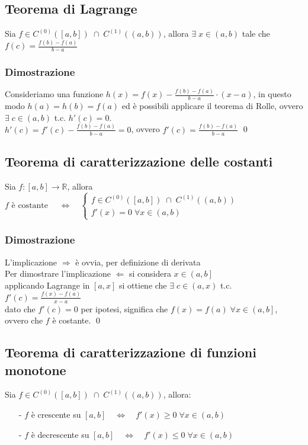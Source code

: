 \documentclass[a4paper]{article}
\newcommand\cont[2]{C^{(#1)} \left({#2}\right)}
\begin{document}
\subsection{Teorema di Lagrange}
Sia \(f \in \cont{0}{\left[a, b\right]} \; \cap \; \cont{1}{\left(a, b\right)}\), allora \(\exists \; x \in \left(a, b\right)\) tale
che \(\displaystyle f(c) = \frac{f(b) - f(a)}{b - a}\)

\subsubsection*{Dimostrazione}
Consideriamo una funzione \(\displaystyle h(x) = f(x) - \frac{f(b) - f(a)}{b- a} \cdot \left(x - a\right)\), in questo modo \(h(a) = h(b) = f(a)\)
ed è possibili applicare il teorema di Rolle, ovvero \(\exists \; c \in \left(a, b\right)\) t.c. \(h'(c) = 0\). \\
\(\displaystyle h'(c) = f'(c) - \frac{f(b) - f(a)}{b - a} = 0\), ovvero \(\displaystyle f'(c) = \frac{f(b) - f(a)}{b - a}\)
\qed

\subsection{Teorema di caratterizzazione delle costanti}
Sia \(f:\left[a,b\right] \to \mathbb{R}\), allora \(\displaystyle f \text{ è costante } \quad \Leftrightarrow \quad
\begin{cases}
	f \in \cont{0}{\left[a, b\right]} \; \cap \; \cont{1}{\left(a, b\right)} \\
	f'(x) = 0 \; \forall x \in \left(a, b\right)
\end{cases}\)

\subsubsection*{Dimostrazione}
L'implicazione \(\Rightarrow\) è ovvia, per definizione di derivata \\
Per dimostrare l'implicazione \(\Leftarrow\) si considera \(x \in \left(a, b\right]\) \\
applicando Lagrange in \(\left[a, x\right]\) si ottiene che \(\exists \; c \in \left(a, x\right)\) t.c. \(\displaystyle f'(c) = \frac{f(x)- f(a)}{x-a}\) \\
dato che \(f'(c) = 0\) per ipotesi, significa che \(f(x) = f(a) \; \forall x \in \left(a, b\right]\), ovvero che \(f\) è costante.
\qed

\subsection{Teorema di caratterizzazione di funzioni monotone}
Sia \(f \in \cont{0}{\left[a, b\right]} \; \cap \; \cont{1}{\left(a, b\right)}\), allora:
\begin{itemize}[topsep=3pt, itemsep=0pt]
	\item[-] \(f\) è crescente su \(\left[a, b\right] \quad \Leftrightarrow \quad f'(x) \geq 0 \; \forall x \in \left(a, b\right)\) 
	\item[-] \(f\) è decrescente su \(\left[a, b\right] \quad \Leftrightarrow \quad f'(x) \leq 0 \; \forall x \in \left(a, b\right)\) 
\end{itemize}
\end{document}
